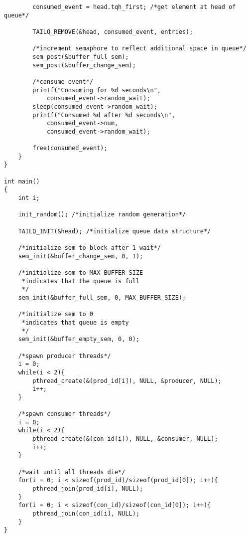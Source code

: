 \documentclass[10pt,onecolumn]{article}
\begin{document}
\begin{lstlisting}
		consumed_event = head.tqh_first; /*get element at head of queue*/

		TAILQ_REMOVE(&head, consumed_event, entries);

		/*increment semaphore to reflect additional space in queue*/
		sem_post(&buffer_full_sem);
		sem_post(&buffer_change_sem);

		/*consume event*/
		printf("Consuming for %d seconds\n",
			consumed_event->random_wait);
		sleep(consumed_event->random_wait);
		printf("Consumed %d after %d seconds\n",
			consumed_event->num,
			consumed_event->random_wait);

		free(consumed_event);
	}
}

int main()
{
	int i;

	init_random(); /*initialize random generation*/

	TAILQ_INIT(&head); /*initialize queue data structure*/

	/*initialize sem to block after 1 wait*/
	sem_init(&buffer_change_sem, 0, 1); 

	/*initialize sem to MAX_BUFFER_SIZE
 	 *indicates that the queue is full
	 */	 	
	sem_init(&buffer_full_sem, 0, MAX_BUFFER_SIZE);

	/*initialize sem to 0
 	 *indicates that queue is empty
	 */
	sem_init(&buffer_empty_sem, 0, 0);

	/*spawn producer threads*/
	i = 0;
	while(i < 2){
		pthread_create(&(prod_id[i]), NULL, &producer, NULL);
		i++;
	}

	/*spawn consumer threads*/
	i = 0;
	while(i < 2){
		pthread_create(&(con_id[i]), NULL, &consumer, NULL);
		i++;
	}

	/*wait until all threads die*/
	for(i = 0; i < sizeof(prod_id)/sizeof(prod_id[0]); i++){
		pthread_join(prod_id[i], NULL);
	}
	for(i = 0; i < sizeof(con_id)/sizeof(con_id[0]); i++){
		pthread_join(con_id[i], NULL);
	}
}


\end{lstlisting}



\end{document}

